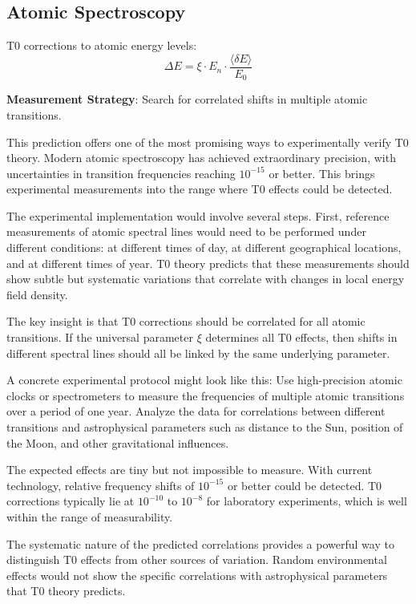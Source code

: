 \documentclass[12pt,a4paper]{article}
\newcommand{\deltaE}{\delta E}
\newcommand{\xipar}{\xi}
\theoremstyle{definition}
\theoremstyle{remark}
\begin{document}
\subsection{Atomic Spectroscopy}

T0 corrections to atomic energy levels:
\begin{equation}
	\Delta E = \xipar \cdot E_n \cdot \frac{\langle \deltaE \rangle}{E_0}
	\label{eq:spectroscopic_shift}
\end{equation}

\textbf{Measurement Strategy}: Search for correlated shifts in multiple atomic transitions.

This prediction offers one of the most promising ways to experimentally verify T0 theory. Modern atomic spectroscopy has achieved extraordinary precision, with uncertainties in transition frequencies reaching $10^{-15}$ or better. This brings experimental measurements into the range where T0 effects could be detected.

The experimental implementation would involve several steps. First, reference measurements of atomic spectral lines would need to be performed under different conditions: at different times of day, at different geographical locations, and at different times of year. T0 theory predicts that these measurements should show subtle but systematic variations that correlate with changes in local energy field density.

The key insight is that T0 corrections should be correlated for all atomic transitions. If the universal parameter $\xipar$ determines all T0 effects, then shifts in different spectral lines should all be linked by the same underlying parameter.

A concrete experimental protocol might look like this: Use high-precision atomic clocks or spectrometers to measure the frequencies of multiple atomic transitions over a period of one year. Analyze the data for correlations between different transitions and astrophysical parameters such as distance to the Sun, position of the Moon, and other gravitational influences.

The expected effects are tiny but not impossible to measure. With current technology, relative frequency shifts of $10^{-15}$ or better could be detected. T0 corrections typically lie at $10^{-10}$ to $10^{-8}$ for laboratory experiments, which is well within the range of measurability.

The systematic nature of the predicted correlations provides a powerful way to distinguish T0 effects from other sources of variation. Random environmental effects would not show the specific correlations with astrophysical parameters that T0 theory predicts.
\end{document}

